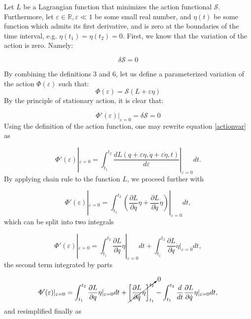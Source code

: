 Let $L$ be a Lagrangian function that minimizes the action functional $\mathcal{S}$. Furthermore, let $\varepsilon\in\mathbb{R}, \varepsilon\ll 1$ be some small real number, and $\eta(t)$ be some function which admits its first derivative, and is zero at the boundaries of the time interval, e.g. $\eta(t_1)=\eta(t_2)=0$. First, we know that the variation of the action is zero. Namely:

\begin{equation}
	\delta \mathcal{S}= 0
\end{equation}

By combining the definitions 3 and 6, let us define a parameterized variation of the action $\Phi(\varepsilon)$ such that:
\begin{equation}
	\Phi(\varepsilon) = \mathcal{S}(L+\varepsilon \eta)
\end{equation}
By the principle of stationary action, it is clear that:

\begin{equation}
	\Phi'(\varepsilon)|_{\varepsilon=0}=\delta \mathcal{S} = 0
\label{actionvar}
\end{equation}
Using the definition of the action function, one may rewrite equation \ref{actionvar} as

\begin{equation}
	\Phi'(\varepsilon)|_{\varepsilon=0}= \int_{t_1}^{t_2}\frac{dL(q+\varepsilon \eta,\dot q + \varepsilon \dot \eta, t)}{d\varepsilon}|_{\varepsilon=0}dt.
\end{equation}
By applying chain rule to the function $L$, we proceed further with

\begin{equation}
	\Phi'(\varepsilon)|_{\varepsilon=0}= \int_{t_1}^{t_2}\left(\frac{\partial L}{\partial q}\eta +\frac{\partial L}{\partial \dot q}\dot \eta\right)|_{\varepsilon=0}dt,
\end{equation}
which can be split into two integrals

\begin{equation}
		\Phi'(\varepsilon)|_{\varepsilon=0}= \int_{t_1}^{t_2}\frac{\partial L}{\partial q}\eta|_{\varepsilon=0} dt +\int_{t_1}^{t_2}\frac{\partial L}{\partial \dot q}\dot \eta|_{\varepsilon=0}dt,
\end{equation}
the second term integrated by parts

\begin{equation}
		\Phi'(\varepsilon)|_{\varepsilon=0}= \int_{t_1}^{t_2}\frac{\partial L}{\partial q}\eta|_{\varepsilon=0} dt +\cancelto{0}{\left[\frac{\partial L}{\partial \dot q}\eta \right]_{t_1}^{t_2}}-\int_{t_1}^{t_2}\frac{d}{dt}\frac{\partial L}{\partial \dot q}\eta|_{\varepsilon=0}dt,
\end{equation}
and resimplified finally as


